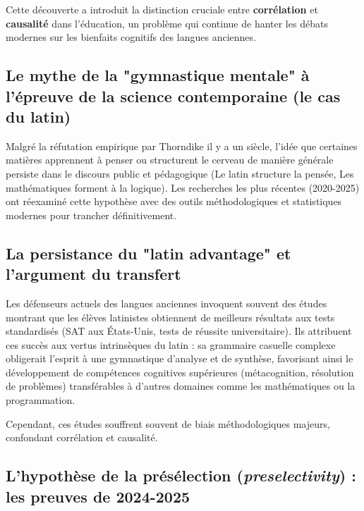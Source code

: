 Cette découverte a introduit la distinction cruciale entre \textbf{corrélation} et
\textbf{causalité} dans l'éducation, un problème qui continue de hanter les débats modernes sur les
bienfaits cognitifs des langues anciennes.\cite{II-1-1-ref17}



\subsection{Le mythe de la "gymnastique mentale" à l'épreuve de la science contemporaine (le cas du latin)}

Malgré la réfutation empirique par Thorndike il y a un siècle, l'idée que certaines matières \og
apprennent à penser\fg{} ou structurent le cerveau de manière générale persiste dans le discours
public et pédagogique (\og Le latin structure la pensée\fg{}, \og Les mathématiques forment à la
logique\fg{}). Les recherches les plus récentes (2020-2025) ont réexaminé cette hypothèse avec des
outils méthodologiques et statistiques modernes pour trancher définitivement.



\subsection{La persistance du "latin advantage" et l'argument du transfert}

Les défenseurs actuels des langues anciennes invoquent souvent des études montrant que les élèves
latinistes obtiennent de meilleurs résultats aux tests standardisés (SAT aux États-Unis, tests de
réussite universitaire).\cite{II-1-1-ref18} Ils attribuent ces succès aux vertus intrinsèques du
latin : sa grammaire casuelle complexe obligerait l'esprit à une gymnastique d'analyse et de
synthèse, favorisant ainsi le développement de compétences cognitives supérieures (métacognition,
résolution de problèmes) transférables à d'autres domaines comme les mathématiques ou la
programmation.\cite{II-1-1-ref18}

Cependant, ces études souffrent souvent de biais méthodologiques majeurs, confondant corrélation et
causalité.



\subsection{L'hypothèse de la présélection (\textit{preselectivity}) : les preuves de 2024-2025}

